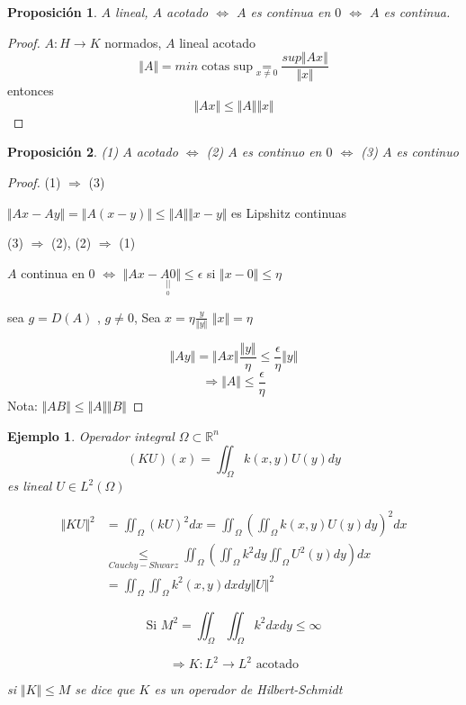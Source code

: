 \documentclass[a4paper,10pt]{book}
\newtheorem{ejemplo}{Ejemplo}
\newtheorem{proposition}{Proposición}
\begin{document}
\begin{proposition}
    $A$ lineal, $A$ acotado $\Leftrightarrow $ $A$ es continua en $0$ $\Leftrightarrow$ $A$ es continua.
    
\end{proposition}
\begin{proof}
    $A: H\rightarrow K$ normados, $A$ lineal acotado 
    \[ \Vert A\Vert = min \; \text{cotas sup} \underset{x\neq0}{=} \frac{sup \Vert Ax\Vert}{\Vert x\Vert}\]
    entonces
    \[
    \Vert A x\Vert \leq \Vert A \Vert \Vert x \Vert
    \]
\end{proof}

\begin{proposition}
    (1) $A$ acotado $\Leftrightarrow$ (2) $A$ es continuo en $0$ $\Leftrightarrow$ (3) $A$ es continuo
\end{proposition}

\begin{proof}
    (1) $\Rightarrow$ (3) 

    $\Vert Ax - Ay \Vert = \Vert A(x-y)\Vert\leq \Vert A \Vert \Vert x-y \Vert$ es Lipshitz continuas

    (3) $\Rightarrow$ (2), (2) $\Rightarrow$ (1)

    $A$ continua en $0$ $\Leftrightarrow$ $\Vert Ax -\underset{\underset{0}{||}}{A0}\Vert \leq \epsilon $ si $\Vert x-0\Vert \leq \eta$

    sea $g=D(A)$ , $g\neq 0$, Sea $x=\eta \frac{y}{\Vert y\Vert}$ $\Vert x \Vert = \eta$

    \[\Vert Ay \Vert = \Vert Ax \Vert \frac{\Vert y \Vert}{\eta} \leq \frac{\epsilon}{\eta} \Vert y\Vert\]
    \[\Rightarrow \Vert A \Vert \leq \frac{\epsilon}{\eta}\]
    Nota: $\Vert AB\Vert \leq \Vert A\Vert \Vert B\Vert$
\end{proof}

\begin{ejemplo}
    Operador integral  $\Omega \subset \mathbb{R}^n $
    \[
    (KU)(x)=\iint_\Omega k(x,y) U(y) dy   
    \]
    es lineal $U\in L^2 (\Omega) $

    \begin{align*}
    \Vert KU \Vert ^2 & = \iint_\Omega (kU)^2 dx = \iint_\Omega  \left( \iint_\Omega k(x,y) U(y) dy \right)^2 dx \\
    &\underset{Cauchy-Shwarz}{\leq} \iint_\Omega \left( \iint_\Omega k^2 dy \iint_\Omega U^2(y) dy \right)dx \\
    & = \iint_\Omega \iint_\Omega k^2(x,y) dx dy \Vert U \Vert^2
    \end{align*}

    \[
    \text{Si   }  M^2 = \iint_\Omega \iint_\Omega k^2 dx dy \leq \infty
    \]

    \[
    \Rightarrow K: L^2 \rightarrow L^2 \text{   acotado}
    \]
    
    si $\Vert K \Vert \leq M $  se dice que $K$ es un operador de Hilbert-Schmidt    
\end{ejemplo}
\end{document}
